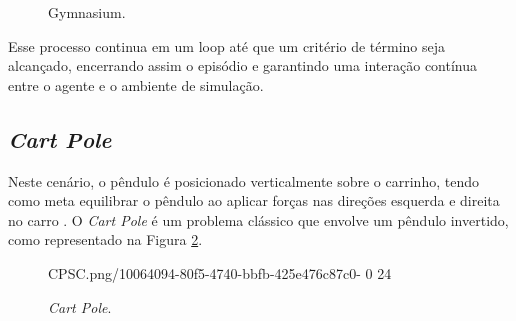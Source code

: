\documentclass[12pt,           %
a4paper,                       %
openany,                       %
oneside,                       %
chapter=TITLE,                 %
english,                       %
spanish,                       %
brazil,                        %
sumario=tradicional]{abntex2}  %
\begin{document}
\begin{OnehalfSpace}
\begin{figure}[H]
    \centering
    \vspace*{-0.25cm}
    \caption{Gymnasium.}
\label{fig:loopgym}
\end{figure}
\vspace*{-0.775cm}
{\raggedright {}}


Esse processo continua em um loop até que um critério de término seja alcançado, encerrando assim o episódio e garantindo uma interação contínua entre o agente e o ambiente de simulação.

\subsection{\textit{Cart Pole}}
\label{sec:AE}

Neste cenário, o pêndulo é posicionado verticalmente sobre o carrinho, tendo como meta equilibrar o pêndulo ao aplicar forças nas direções esquerda e direita no carro \cite{cartpole}. O \textit{Cart Pole} é um problema clássico que envolve um pêndulo invertido, como representado na Figura \ref{fig:GPC1}.

\begin{figure}[H]
    \centering
    \vspace*{-0.25cm}
    \caption{\textit{Cart Pole}.}
    {CPSC.png/10064094-80f5-4740-bbfb-425e476c87c0-}%
    {0}%
    {24}%
    \label{fig:GPC1}
\end{figure}
\vspace*{-.8cm}
{\raggedright {}}


\end{OnehalfSpace}
\end{document}
